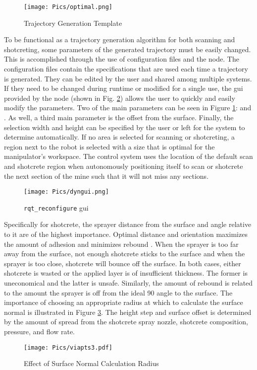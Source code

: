 \clearpage
\begin{figure}
    \centering
    \texttt{[image: Pics/optimal.png]}
    \caption{Trajectory Generation Template}
    \label{fig:idealspray}
\end{figure}
To be functional as a trajectory generation algorithm for both scanning and shotcreting, some parameters of the generated trajectory must be easily changed. This is accomplished through the use of configuration files and the  node. The configuration files contain the specifications that are used each time a trajectory is generated. They can be edited by the user and shared among multiple systems. If they need to be changed during runtime or modified for a single use, the \acrshort{gui} provided by the  node (shown in Fig. \ref{fig:dyngui}) allows the user to quickly and easily modify the parameters. Two of the main parameters can be seen in Figure \ref{fig:idealspray}:  and . As well, a third main parameter is the offset from the surface. Finally, the selection width and height can be specified by the user or left for the system to determine automatically. If no area is selected for scanning or shotcreting, a region next to the robot is selected with a size that is optimal for the manipulator's workspace. The control system uses the location of the default scan and shotcrete region when autonomously positioning itself to scan or shotcrete the next section of the mine such that it will not miss any sections.\\

\begin{figure}[h]
    \centering
    \texttt{[image: Pics/dyngui.png]}
    \caption{\texttt{rqt\_reconfigure} \acrshort{gui}}
    \label{fig:dyngui}
\end{figure}

Specifically for shotcrete, the sprayer distance from the surface and angle relative to it are of the highest importance. Optimal distance and orientation maximizes the amount of adhesion and minimizes rebound  \cite{spraypat}. When the sprayer is too far away from the surface, not enough shotcrete sticks to the surface and when the sprayer is too close, shotcrete will bounce off the surface. In both cases, either shotcrete is wasted or the applied layer is of insufficient thickness. The former is uneconomical and the latter is unsafe. Similarly, the amount of rebound is related to the amount the sprayer is off from the ideal 90\degree\hspace{0pt} angle to the surface. The importance of choosing an appropriate radius at which to calculate the surface normal is illustrated in Figure \ref{fig:vianorm}. The height step and surface offset is determined by the amount of spread from the shotcrete spray nozzle, shotcrete composition, pressure, and flow rate.\\
\clearpage
\begin{figure}[h]
    \centering
    \texttt{[image: Pics/viapts3.pdf]}
    \caption{Effect of Surface Normal Calculation Radius}
    \label{fig:vianorm}
\end{figure}

